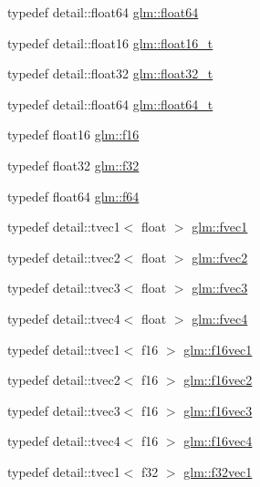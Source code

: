 \begin{DoxyCompactItemize}
\item 
typedef detail\+::float64 \hyperlink{group__gtc__type__precision_gab721f828b41f46b20cf4883b50733d3b}{glm\+::float64}
\item 
typedef detail\+::float16 \hyperlink{group__gtc__type__precision_ga7dd9d64b24117690e47631d07f08a207}{glm\+::float16\+\_\+t}
\item 
typedef detail\+::float32 \hyperlink{group__gtc__type__precision_ga642737ae3e7c434b366f2191e6944bf2}{glm\+::float32\+\_\+t}
\item 
typedef detail\+::float64 \hyperlink{group__gtc__type__precision_gade966a3eb25ebeb16dd53c40d3fdeb46}{glm\+::float64\+\_\+t}
\item 
typedef float16 \hyperlink{group__gtc__type__precision_ga55dd9f02a8b986348956057fd5f45c0d}{glm\+::f16}
\item 
typedef float32 \hyperlink{group__gtc__type__precision_ga0ec999b57f5330d9021256e96038df04}{glm\+::f32}
\item 
typedef float64 \hyperlink{group__gtc__type__precision_ga2bba392e555124b36cde6abba349bab3}{glm\+::f64}
\item 
typedef detail\+::tvec1$<$ float $>$ \hyperlink{group__gtc__type__precision_ga432dcb1d24c21c1b9fead0739a4af218}{glm\+::fvec1}
\item 
typedef detail\+::tvec2$<$ float $>$ \hyperlink{group__gtc__type__precision_ga68722f27c558737659b1bd1eac4d1686}{glm\+::fvec2}
\item 
typedef detail\+::tvec3$<$ float $>$ \hyperlink{group__gtc__type__precision_gaa3a8ce13ad981d1e1791070f52a885c7}{glm\+::fvec3}
\item 
typedef detail\+::tvec4$<$ float $>$ \hyperlink{group__gtc__type__precision_ga5130b151317f24b13f1d0aa999f5fa36}{glm\+::fvec4}
\item 
typedef detail\+::tvec1$<$ f16 $>$ \hyperlink{group__gtc__type__precision_ga56f4754172a1f0fb186d95e865106f5a}{glm\+::f16vec1}
\item 
typedef detail\+::tvec2$<$ f16 $>$ \hyperlink{group__gtc__type__precision_gaba661ca6411ee721e3db5b42ff2755a3}{glm\+::f16vec2}
\item 
typedef detail\+::tvec3$<$ f16 $>$ \hyperlink{group__gtc__type__precision_gaf59829bded825811f821a3e2aaf6db04}{glm\+::f16vec3}
\item 
typedef detail\+::tvec4$<$ f16 $>$ \hyperlink{group__gtc__type__precision_gabf914b5cb8fad08b5897f53e7560a2de}{glm\+::f16vec4}
\item 
typedef detail\+::tvec1$<$ f32 $>$ \hyperlink{group__gtc__type__precision_ga7cc1cb4f45d7274383e6f4ee7fd46f33}{glm\+::f32vec1}

\end{DoxyCompactItemize}
